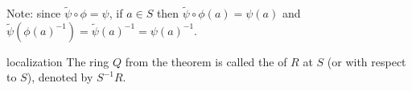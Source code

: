 \documentclass[12pt,letterpaper]{report}
\begin{document}
\begin{center}
\end{center}

Note: since $\tilde{\psi} \circ \phi = \psi$, if $a \in S$ then
$\tilde{\psi} \circ \phi(a) = \psi(a)$ and
$\tilde{\psi}(\phi(a)^{-1}) = \tilde{\psi}(a)^{-1} = \psi(a)^{-1}$.

\begin{defn}{localization}{}
  The ring $Q$ from the theorem is called the  of $R$ at $S$ (or with respect to
  $S$), denoted by $S^{-1}R$.
\end{defn}
\end{document}
